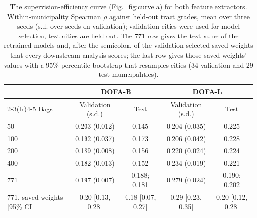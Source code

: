 \begin{table}[htbp]
\centering
\caption{The supervision-efficiency curve (Fig.~\ref{fig:curve}a) for both feature extractors. Within-municipality Spearman $\rho$ against held-out tract grades, mean over three seeds (s.d. over seeds on validation); validation cities were used for model selection, test cities are held out. The 771 row gives the test value of the retrained models and, after the semicolon, of the validation-selected saved weights that every downstream analysis scores; the last row gives those saved weights' values with a 95\% percentile bootstrap that resamples cities (34 validation and 29 test municipalities).}
\small
\begin{tabular}{lcccc}
\toprule
 & \multicolumn{2}{c}{DOFA-B} & \multicolumn{2}{c}{DOFA-L}\\
\cmidrule(lr){2-3}\cmidrule(lr){4-5}
Bags & Validation (s.d.) & Test & Validation (s.d.) & Test\\
\midrule
50 & 0.203 (0.012) & 0.145 & 0.204 (0.035) & 0.225\\
100 & 0.192 (0.037) & 0.173 & 0.206 (0.042) & 0.228\\
200 & 0.189 (0.008) & 0.156 & 0.220 (0.024) & 0.224\\
400 & 0.182 (0.013) & 0.152 & 0.234 (0.019) & 0.221\\
771 & 0.197 (0.007) & 0.188; 0.181 & 0.279 (0.024) & 0.190; 0.202\\
\midrule
771, saved weights [95\% CI] & 0.20 [0.13, 0.28] & 0.18 [0.07, 0.27] & 0.29 [0.23, 0.35] & 0.20 [0.12, 0.28]\\
\bottomrule
\end{tabular}
\label{tab:curve}
\end{table}
